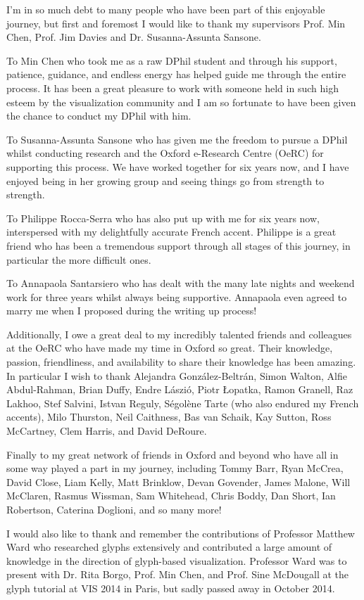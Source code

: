 \begin{acknowledgements}

\noindent I'm in so much debt to many people who have been part of this enjoyable journey, but first and foremost I would like to thank my supervisors Prof. Min Chen, Prof. Jim Davies and Dr. Susanna-Assunta Sansone. 


To Min Chen who took me as a raw DPhil student and through his support, patience, guidance, and endless energy has helped guide me through the entire process. 
It has been a great pleasure to work with someone held in such high esteem by the visualization community and I am so fortunate to have been given the chance to conduct my DPhil with him.


To Susanna-Assunta Sansone who has given me the freedom to pursue a DPhil whilst conducting research and the Oxford e-Research Centre (OeRC) for supporting this process. 
We have worked together for six years now, and I have enjoyed being in her growing group and seeing things go from strength to strength.

To Philippe Rocca-Serra who has also put up with me for six years now, interspersed with my delightfully accurate French accent. 
Philippe is a great friend who has been a tremendous support through all stages of this journey, in particular the more difficult ones. 

To Annapaola Santarsiero who has dealt with the many late nights and weekend work for three years whilst always being supportive.
Annapaola even agreed to marry me when I proposed during the writing up process!

Additionally, I owe a great deal to my incredibly talented friends and colleagues at the OeRC who have made my time in Oxford so great.
Their knowledge, passion, friendliness, and availability to share their knowledge has been amazing.
In particular I wish to thank Alejandra González-Beltrán, Simon Walton, Alfie Abdul-Rahman, Brian Duffy, Endre Lászió, Piotr Łopatka, Ramon Granell, Raz Lakhoo, Stef Salvini, Istvan Reguly, Ségolène Tarte (who also endured my French accents), Milo Thurston, Neil Caithness, Bas van Schaik, Kay Sutton, Ross McCartney, Clem Harris, and David DeRoure. 

Finally to my great network of friends in Oxford and beyond who have all in some way played a part in my journey, including Tommy Barr, Ryan McCrea, David Close, Liam Kelly, Matt Brinklow, Devan Govender, James Malone, Will McClaren, Rasmus Wissman, Sam Whitehead, Chris Boddy, Dan Short, Ian Robertson, Caterina Doglioni, and so many more!

I would also like to thank and remember the contributions of Professor Matthew Ward who researched glyphs extensively and contributed a large amount of knowledge in the direction of glyph-based visualization.
Professor Ward was to present with Dr. Rita Borgo, Prof. Min Chen, and Prof. Sine McDougall at the glyph tutorial at VIS 2014 in Paris, but sadly passed away in October 2014.

\end{acknowledgements}
